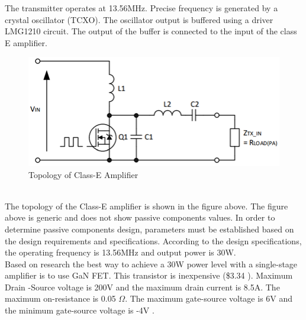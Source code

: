 \documentclass[12pt]{article}
\begin{document}
\indent
The transmitter operates at 13.56MHz.  Precise frequency is generated by a crystal oscillator (TCXO). The oscillator output is buffered using a driver LMG1210 circuit. The output of the buffer is connected to the input of the class E amplifier.\\
\hfill
\begin{figure}[h!]
\centering
\includegraphics[width=0.9\linewidth]{top_class_e_amp}
\caption{Topology of Class-E Amplifier}
\end{figure}
\hfill \\
\indent
The topology of the Class-E amplifier is shown in the figure above. The figure above is generic and does not show passive components values. In order to determine passive components design, parameters must be established based on the design requirements and specifications. According to the design specifications, the operating frequency is 13.56MHz and output power is 30W.\\

\indent
Based on research the best way to achieve a 30W power level with a single-stage amplifier is to use GaN FET. This transistor is inexpensive (\$3.34 ). Maximum Drain -Source voltage is 200V and the maximum drain current is 8.5A. The maximum on-resistance is 0.05 $\Omega$. The maximum gate-source voltage is 6V and the minimum gate-source voltage is -4V \cite{EPC2019}.\\
\end{document}
